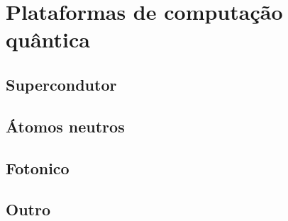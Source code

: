\newpage
\section{Plataformas de computação quântica }

\subsection{Supercondutor}
\subsection{Átomos neutros}
\subsection{Fotonico }
\subsection{Outro }